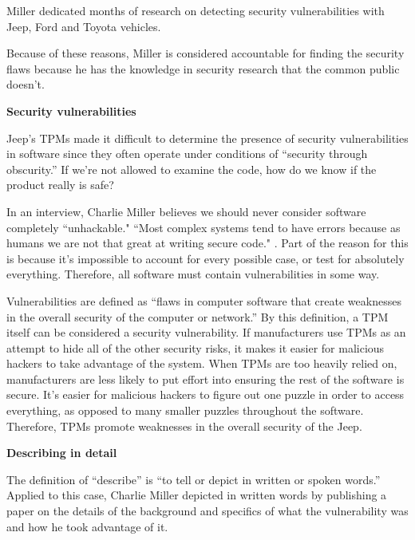 \documentclass[12pt]{article}
\begin{document}
\begin{multicols}{2}
Miller dedicated months of research on detecting security vulnerabilities with Jeep, Ford and Toyota vehicles.\cite{officialPaper}

Because of these reasons, Miller is considered accountable for finding the security flaws because he has the knowledge in security research that the common public doesn't.

\vspace{.5cm}\hspace{-.5cm}\textbf{Security vulnerabilities}\vspace{.2cm}

Jeep's TPMs made it difficult to determine the presence of security vulnerabilities in software since they often operate under conditions of ``security through obscurity.'' \cite{chris} If we're not allowed to examine the code, how do we know if the product really is safe?

In an interview, Charlie Miller believes we should never consider software completely ``unhackable."\cite{unhackableInterview}\cite{youtube} ``Most complex systems tend to have errors because as humans we are not that great at writing secure code." \cite{unhackableInterview}. Part of the reason for this is because it's impossible to account for every possible case, or test for absolutely everything. \cite {turner} Therefore, all software must contain vulnerabilities in some way.

Vulnerabilities are defined as ``flaws in computer software that create weaknesses in the overall security of the computer or network.''\cite{norton} By this definition, a TPM itself  can be considered a security vulnerability. If manufacturers use TPMs as an attempt to hide all of the other security risks, it makes it easier for malicious hackers to take advantage of the system. When TPMs are too heavily relied on, manufacturers are  less likely to put effort into ensuring the rest of the software is secure. \cite{turner} 
It's easier for malicious hackers to figure out one puzzle in order to access everything, as opposed to many smaller puzzles throughout the software. Therefore, TPMs promote weaknesses in the overall security of the Jeep.

\vspace{.5cm}\hspace{-.5cm}\textbf{Describing in detail}\vspace{.2cm}

The definition of ``describe'' is ``to tell or depict in written or spoken words.''\cite{dictionary} Applied to this case, Charlie Miller depicted in written words by publishing a paper on the details of the background and specifics of what the vulnerability was and how he took advantage of it. \cite{officialPaper} 


\end{multicols}
\end{document}

